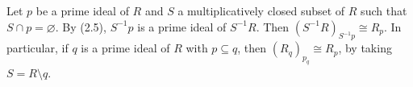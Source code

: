 Let $p$ be a prime ideal of $R$ and $S$ a multiplicatively closed subset of $R$
such that $S\cap p = \varnothing$. By (2.5), $S^{-1}p$ is a prime ideal of
$S^{-1}R$. Then $(S^{-1}R)_{S^{-1}p}\cong R_p$. In particular, if $q$ is a prime
ideal of $R$ with $p \subseteq q$, then $(R_q)_{p_q} \cong R_p$, by taking
$S = R\setminus q$.
